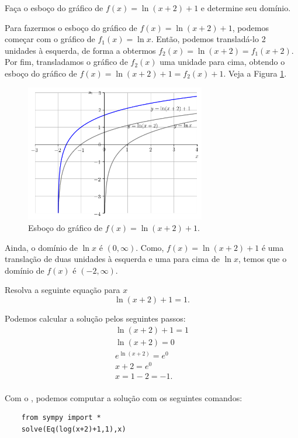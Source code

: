 \begin{exeresol}
  Faça o esboço do gráfico de $f(x) = \ln(x+2)+1$ e determine seu domínio.
\end{exeresol}
\begin{resol}
  Para fazermos o esboço do gráfico de $f(x) = \ln(x+2)+1$, podemos começar com o gráfico de $f_1(x) = \ln x$. Então, podemos transladá-lo 2 unidades à esquerda, de forma a obtermos $f_2(x) = \ln(x+2) = f_1(x+2)$. Por fim, transladamos o gráfico de $f_2(x)$ uma unidade para cima, obtendo o esboço do gráfico de $f(x) = \ln(x+2)+1=f_2(x)+1$. Veja a Figura \ref{fig:exeresol_lograf}.

  \begin{figure}[H]
    \centering
    \includegraphics[width=0.7\textwidth]{./cap_funcao/dados/fig_exeresol_lograf/fig_exeresol_lograf}
    \caption{Esboço do gráfico de $f(x) = \ln(x+2)+1$.}
    \label{fig:exeresol_lograf}
  \end{figure}

Ainda, o domínio de $\ln x$ é $(0, \infty)$. Como, $f(x) = \ln(x+2)+1$ é uma translação de duas unidades à esquerda e uma para cima de $\ln x$, temos que o domínio de $f(x)$ é $(-2, \infty)$.
\end{resol}

\begin{exeresol}
  Resolva a seguinte equação para $x$
  \begin{equation}
    \ln(x+2) + 1 = 1. 
  \end{equation}
\end{exeresol}
\begin{resol}
  Podemos calcular a solução pelos seguintes passos:
  \begin{gather}
    \ln(x+2)+1=1\\
    \ln(x+2)=0\\
    e^{\ln(x+2)} = e^0\\
    x+2=e^0\\
    x=1-2=-1.\\
  \end{gather}

  \ifispython
  Com o {\sympy}, podemos computar a solução com os seguintes comandos:
  \begin{lstlisting}
    from sympy import *
    solve(Eq(log(x+2)+1,1),x)
  \end{lstlisting}
  \fi
\end{resol}

